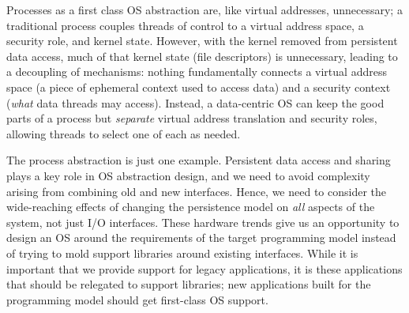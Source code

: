 Processes as a first class OS abstraction are, like virtual addresses, unnecessary; a traditional process couples
threads of control to a virtual address space, a security role, and kernel state.
However, with the kernel removed from
persistent data access, much of that kernel state (\eg file descriptors) is unnecessary,
leading to a decoupling of mechanisms:
nothing fundamentally connects a virtual address space
(a piece of ephemeral context used to access data) and a security context (\emph{what} data
threads may access).
Instead, a data-centric OS can keep the good parts of a process but \emph{separate} virtual address
translation and security roles, allowing threads to select one of each as needed.

The process abstraction is just one example. Persistent data access and sharing plays a key role in OS
abstraction design, and we need to avoid complexity arising from combining old and new interfaces.
Hence, we need to consider the
wide-reaching effects of changing the persistence model on \emph{all} aspects of the system, not
just I/O interfaces. These hardware trends give us an opportunity to design an OS around the requirements
of the target programming model instead of trying to mold support libraries around existing
interfaces. While it is important that we provide support for legacy applications,
it is these applications that should be relegated to support libraries; new applications built for
the programming model should get first-class OS support.


